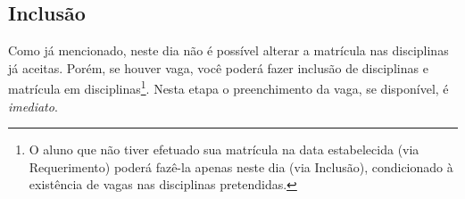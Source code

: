 \documentclass[a4paper,12pt,openany]{article}
\begin{document}
\subsection{Inclusão}

Como já mencionado, neste dia não é possível alterar a matrícula nas disciplinas já aceitas. Porém, se houver vaga, você poderá fazer inclusão de disciplinas e matrícula em disciplinas\footnote{O aluno que não tiver efetuado sua matrícula na data estabelecida (via Requerimento) poderá fazê-la apenas neste dia (via Inclusão), condicionado à existência de vagas nas disciplinas pretendidas.}.
Nesta etapa o preenchimento da vaga, se disponível, é \textit{imediato}.
\end{document}
